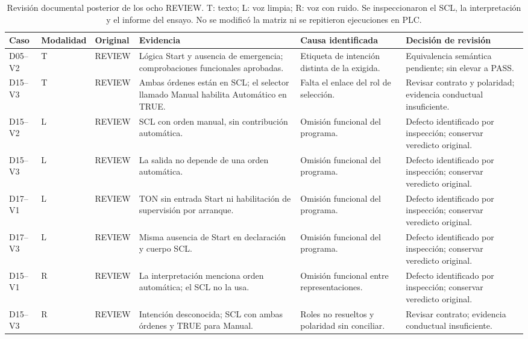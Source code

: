 \documentclass[a4paper,fleqn]{cas-dc}
\begin{document}
\begin{table}[!tp]
\caption{Revisión documental posterior de los ocho REVIEW. T: texto; L: voz limpia; R: voz con ruido. Se inspeccionaron el SCL, la interpretación y el informe del ensayo. No se modificó la matriz ni se repitieron ejecuciones en PLC.}
\label{tab:revision_review}
\footnotesize
\begin{tabularx}{\textwidth}{@{}l l l >{\raggedright\arraybackslash}X >{\raggedright\arraybackslash}X >{\raggedright\arraybackslash}X@{}}
\toprule Caso & Modalidad & Original & Evidencia & Causa identificada & Decisión de revisión\\ \midrule
D05--V2 & T & REVIEW & Lógica Start y ausencia de emergencia; comprobaciones funcionales aprobadas. & Etiqueta de intención distinta de la exigida. & Equivalencia semántica pendiente; sin elevar a PASS.\\
D15--V3 & T & REVIEW & Ambas órdenes están en SCL; el selector llamado Manual habilita Automático en TRUE. & Falta el enlace del rol de selección. & Revisar contrato y polaridad; evidencia conductual insuficiente.\\
D15--V2 & L & REVIEW & SCL con orden manual, sin contribución automática. & Omisión funcional del programa. & Defecto identificado por inspección; conservar veredicto original.\\
D15--V3 & L & REVIEW & La salida no depende de una orden automática. & Omisión funcional del programa. & Defecto identificado por inspección; conservar veredicto original.\\
D17--V1 & L & REVIEW & TON sin entrada Start ni habilitación de supervisión por arranque. & Omisión funcional del programa. & Defecto identificado por inspección; conservar veredicto original.\\
D17--V3 & L & REVIEW & Misma ausencia de Start en declaración y cuerpo SCL. & Omisión funcional del programa. & Defecto identificado por inspección; conservar veredicto original.\\
D15--V1 & R & REVIEW & La interpretación menciona orden automática; el SCL no la usa. & Omisión funcional entre representaciones. & Defecto identificado por inspección; conservar veredicto original.\\
D15--V3 & R & REVIEW & Intención desconocida; SCL con ambas órdenes y TRUE para Manual. & Roles no resueltos y polaridad sin conciliar. & Revisar contrato; evidencia conductual insuficiente.\\
\bottomrule
\end{tabularx}
\end{table}
\end{document}
